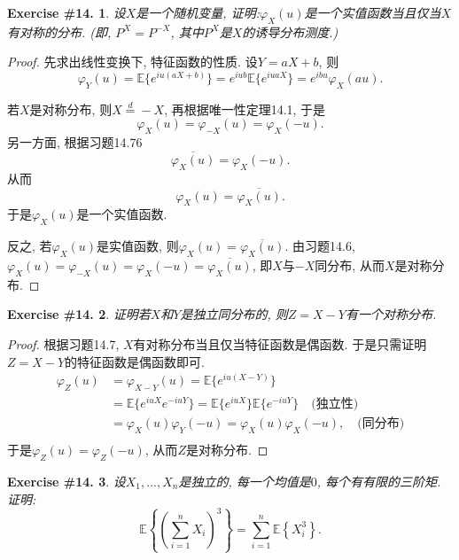 \documentclass[UTF8, a4paper]{article}
\newtheorem{exercise}{Exercise \#14.}
\begin{document}
\begin{framed}
\begin{exercise}
设\(X\)是一个随机变量, 证明:\(\varphi_X(u)\)是一个实值函数当且仅当\(X\)有对称的分布.
(即, \(P^X = P^{-X}\), 其中\(P^X\)是\(X\)的诱导分布测度.)
\end{exercise}
\end{framed}

\begin{proof}
先求出线性变换下, 特征函数的性质. 设\(Y = aX +b\), 则
$$
\varphi_Y(u) = \mathbb{E}\{e^{iu(aX+b)}\} = e^{iub} \mathbb{E}\{e^{iuaX}\} = e^{ibu} \varphi_X(au).
$$

若\(X\)是对称分布, 则\(X \overset{d}{=} -X\), 再根据唯一性定理14.1, 于是
$$
\varphi_X(u) = \varphi_{-X}(u) = \varphi_{X}(-u).
$$
另一方面, 根据习题14.76
$$
\overline{\varphi_X(u)}=\varphi_X(-u) .
$$
从而
$$
\varphi_X(u) = \overline{\varphi_X(u)}.
$$
于是\(\varphi_X(u)\)是一个实值函数.

反之, 若\(\varphi_X(u)\)是实值函数, 则\(\varphi_X(u) = \overline{\varphi_X(u)}.\)
由习题14.6, \(\varphi_X(u) = \varphi_{-X}(u) = \varphi_X(-u) = \overline{\varphi_X(u)}\), 即\(X\)与\(-X\)同分布, 从而\(X\)是对称分布.
\end{proof}


\begin{framed}
\begin{exercise}
证明若\(X\)和\(Y\)是独立同分布的, 则\(Z = X-Y\)有一个对称分布.
\end{exercise}
\end{framed}

\begin{proof}


根据习题14.7, \(X\)有对称分布当且仅当特征函数是偶函数. 于是只需证明\(Z = X - Y\)的特征函数是偶函数即可.
$$
\begin{aligned}
    \varphi_Z(u) &= \varphi_{X-Y}(u) = \mathbb{E}\{e^{iu(X-Y)}\} \\
    &= \mathbb{E}\{e^{iuX}e^{-iuY}\} = \mathbb{E}\{e^{iuX}\}\mathbb{E}\{e^{-iuY}\} \quad \text{(独立性)}\\
    &= \varphi_X(u) \varphi_Y(-u) = \varphi_X(u) \varphi_X(-u), \quad \text{(同分布)}\\
\end{aligned}
$$
于是\(\varphi_Z(u) = \varphi_Z(-u)\), 从而\(Z\)是对称分布.
\end{proof}



\begin{framed}
\begin{exercise}
设\(X_1, ..., X_n\)是独立的, 每一个均值是\(0\), 每个有有限的三阶矩. 证明: 
$$
\mathbb{E}\left\{\left(\sum_{i=1}^n X_i\right)^3\right\}=\sum_{i=1}^n \mathbb{E}\left\{X_i^3\right\} .
$$
\end{exercise}
\end{framed}
\end{document}

